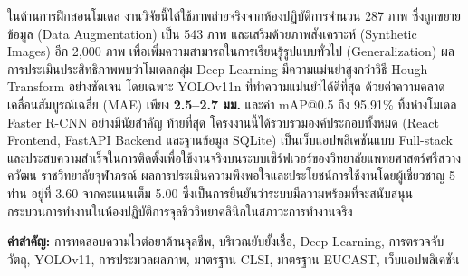 ในด้านการฝึกสอนโมเดล งานวิจัยนี้ได้ใช้ภาพถ่ายจริงจากห้องปฏิบัติการจำนวน 287 ภาพ ซึ่งถูกขยายข้อมูล (Data Augmentation) เป็น 543 ภาพ และเสริมด้วยภาพสังเคราะห์ (Synthetic Images) อีก 2,000 ภาพ เพื่อเพิ่มความสามารถในการเรียนรู้รูปแบบทั่วไป (Generalization) ผลการประเมินประสิทธิภาพพบว่าโมเดลกลุ่ม Deep Learning มีความแม่นยำสูงกว่าวิธี Hough Transform อย่างชัดเจน โดยเฉพาะ YOLOv11n ที่ทำความแม่นยำได้ดีที่สุด ด้วยค่าความคลาดเคลื่อนสัมบูรณ์เฉลี่ย (MAE) เพียง \textbf{2.5--2.7 มม.} และค่า mAP@0.5 ถึง 95.91\% ทิ้งห่างโมเดล Faster R-CNN อย่างมีนัยสำคัญ ท้ายที่สุด โครงงานนี้ได้รวบรวมองค์ประกอบทั้งหมด (React Frontend, FastAPI Backend และฐานข้อมูล SQLite) เป็นเว็บแอปพลิเคชันแบบ Full-stack และประสบความสำเร็จในการติดตั้งเพื่อใช้งานจริงบนระบบเซิร์ฟเวอร์ของวิทยาลัยแพทยศาสตร์ศรีสวางควัฒน ราชวิทยาลัยจุฬาภรณ์ ผลการประเมินความพึงพอใจและประโยชน์การใช้งานโดยผู้เชี่ยวชาญ 5 ท่าน อยู่ที่ 3.60 จากคะแนนเต็ม 5.00 ซึ่งเป็นการยืนยันว่าระบบมีความพร้อมที่จะสนับสนุนกระบวนการทำงานในห้องปฏิบัติการจุลชีววิทยาคลินิกในสภาวะการทำงานจริง

\noindent\textbf{คำสำคัญ:} การทดสอบความไวต่อยาต้านจุลชีพ, บริเวณยับยั้งเชื้อ, Deep Learning, การตรวจจับวัตถุ,
YOLOv11, การประมวลผลภาพ, มาตรฐาน CLSI, มาตรฐาน EUCAST, เว็บแอปพลิเคชัน

\newpage
